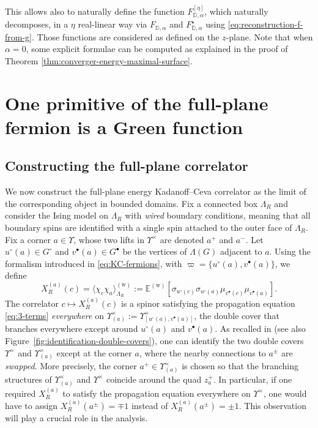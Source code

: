 \documentclass[reqno]{amsart}
\numberwithin{equation}{section}
\theoremstyle{definition}
\theoremstyle{remark}
\begin{document}
This allows also to naturally define the function $F^{[\eta]}_{\mathbb{D},\alpha}$, which naturally decomposes, in a $\eta$ real-linear way via $F_{\mathbb{D},\alpha}$ and $F^\star_{\mathbb{D},\alpha}$ using \eqref{eq:reconstruction-f-from-g}. Those functions are considered as defined on the $z$-plane.  
Note that when $\alpha =0$, some explicit formulae can be computed as explained in the proof of Theorem \ref{thm:converger-energy-maximal-surface}.

\section{One primitive of the full-plane fermion is a Green function}\label{sec:identification-energy-correlator}

\subsection{Constructing the full-plane correlator}\label{sub:construction-full-plane-energy}


We now construct the full-plane energy Kadanoff–Ceva correlator as the limit of the corresponding object in bounded domains. Fix a connected box $\Lambda_R$ and consider the Ising model on $\Lambda_R$ with \emph{wired} boundary conditions, meaning that all boundary spins are identified with a single spin attached to the outer face of $\Lambda_R$. Fix a corner $a \in \Upsilon$, whose two lifts in $\Upsilon^{\times}$ are denoted $a^+$ and $a^-$. Let $u^\circ(a) \in G^\circ$ and $v^\bullet(a) \in G^\bullet$ be the vertices of $\Lambda(G)$ adjacent to $a$. Using the formalism introduced in \eqref{eq:KC-fermions}, with $\varpi = \{u^{\circ}(a), v^{\bullet}(a)\}$, we define
\begin{equation}\label{eq:def-KC-energy}
    X_{R}^{(a)}(c)
    = \langle \chi_c \chi_a \rangle^{\mathrm{(w)}}_{\Lambda_R}
    := \mathbb{E}^{\mathrm{(w)}}\!\left[ \sigma_{u^{\circ}(c)} \sigma_{u^{\circ}(a)} \mu_{v^{\bullet}(c)} \mu_{v^{\bullet}(a)} \right].
\end{equation}
The correlator $c \mapsto X_{R}^{(a)}(c)$ is a spinor satisfying the propagation equation \eqref{eq:3-terms} \emph{everywhere} on $\Upsilon^{\times}_{(a)} := \Upsilon^{\times}_{[u^{\circ}(a), v^{\bullet}(a)]}$, the double cover that branches everywhere except around $u^{\circ}(a)$ and $v^{\bullet}(a)$. As recalled in \cite[Figure~6]{Cim-universality} (see also Figure~\ref{fig:identification-double-covers}), one can identify the two double covers $\Upsilon^{\times}$ and $\Upsilon^{\times}_{(a)}$ except at the corner $a$, where the nearby connections to $a^{\pm}$ are \emph{swapped}. More precisely, the corner $a^+ \in \Upsilon^{\times}_{(a)}$ is chosen so that the branching structures of $\Upsilon^{\times}_{(a)}$ and $\Upsilon^{\times}$ coincide around the quad $z^{+}_{a}$. In particular, if one required $X^{(a)}_{R}$ to satisfy the propagation equation everywhere on $\Upsilon^{\times}$, one would have to assign $X^{(a)}_{R}(a^\pm) = \mp 1$ instead of $X^{(a)}_{R}(a^\pm) = \pm 1$. This observation will play a crucial role in the analysis.
\end{document}
